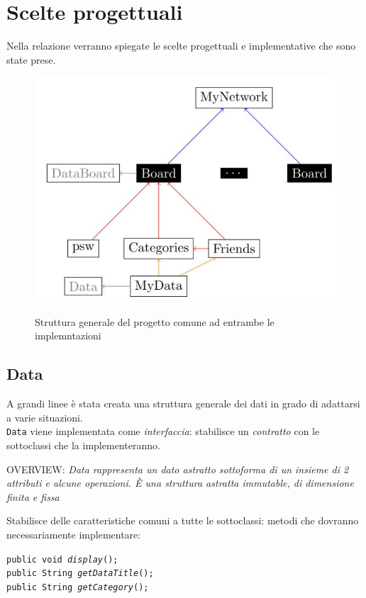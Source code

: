 \documentclass[10pt, a4paper]{article}
\begin{document}
\clearpage

\section{Scelte progettuali}
Nella relazione verranno spiegate le scelte progettuali e implementative che sono state prese.

\begin{figure}[h!]
	\centering
	\includegraphics[scale=0.4]{diag1}
	\label{fig:diag1}
	\caption{Struttura generale del progetto comune ad entrambe le implemntazioni}
\end{figure}

\subsection{Data}
A grandi linee è stata creata una struttura generale dei dati in grado di adattarsi a varie situazioni.\\ \texttt{Data} viene implementata come \textit{interfaccia}: stabilisce un \textit{contratto} con le sottoclassi che la implementeranno. 
\begin{center}
OVERVIEW: \textit{Data rappresenta un dato astratto sottoforma di un insieme di 2 attributi e alcune operazioni. È una struttura astratta immutable, di dimensione finita e fissa}
\end{center}
Stabilisce delle caratteristiche comuni a tutte le sottoclassi: metodi che dovranno necessariamente implementare: 
\begin{center}
\texttt{public void \emph{display}();\\public String \emph{getDataTitle}();\\public 		String \emph{getCategory}();}
\end{center}
\end{document}
